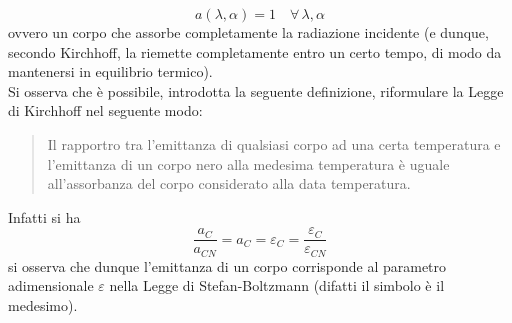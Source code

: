 \documentclass[10pt, oneside]{book}
\begin{document}
\[a(\lambda, \alpha) = 1 \quad \forall \, \lambda, \alpha\]
ovvero un corpo che assorbe completamente la radiazione incidente (e dunque, secondo Kirchhoff, la riemette completamente entro un certo tempo, di modo da mantenersi in equilibrio termico).\\
Si osserva che è possibile, introdotta la seguente definizione, riformulare la Legge di Kirchhoff nel seguente modo:
\begin{quote}
Il rapportro tra l'emittanza  di qualsiasi corpo ad una certa temperatura e l'emittanza di un corpo nero alla medesima temperatura è uguale all'assorbanza del corpo considerato alla data temperatura.
\end{quote}
Infatti si ha
\[\frac{a_{C}}{a_{CN}} = a_{C} = \varepsilon_{C} = \frac{\varepsilon_{C}}{\varepsilon_{CN}}\]
si osserva che dunque l'emittanza di un corpo corrisponde al parametro adimensionale $\varepsilon$ nella Legge di Stefan-Boltzmann (difatti il simbolo è il medesimo).
\end{document}
